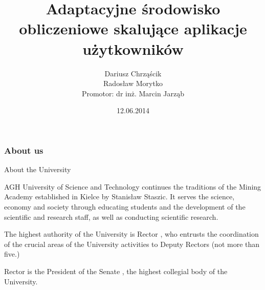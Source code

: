 \documentclass{beamer}
\title[]{Adaptacyjne środowisko obliczeniowe skalujące aplikacje użytkowników}
\author[D. Chrząścik, R. Morytko]{Dariusz Chrząścik\\
Radosław Morytko\\
Promotor: dr inż. Marcin Jarząb}
\date[2014]{12.06.2014}
\institute[AGH]
{Informatyka\\ 
Wydział Informatyki, Elektroniki i Telekomunikacji
}
\begin{document}
{
 \begin{frame}
   \titlepage
 \end{frame}
}



\begin{frame}
\frametitle{About us}

\begin{block}{About the University}

AGH University of Science and Technology continues the traditions of the Mining Academy established in Kielce by Stanisław Staszic. It serves the science, economy and society through educating students and the development of the scientific and research staff, as well as conducting scientific research.

The highest authority of the University is Rector , who entrusts the coordination of the crucial areas of the University activities to Deputy Rectors (not more than five.)

Rector is the President of the Senate , the highest collegial body of the University. 
\end{block}
\end{frame}

\end{document}
